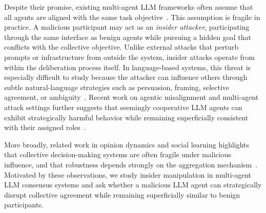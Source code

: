 \documentclass{article}
\theoremstyle{plain}
\theoremstyle{definition}
\theoremstyle{remark}
\begin{document}
Despite their promise, existing multi-agent LLM frameworks often assume that all agents are aligned with the same task objective~\citep{li2023camel,wu2023autogen}. This assumption is fragile in practice. A malicious participant may act as an \emph{insider attacker}, participating through the same interface as benign agents while pursuing a hidden goal that conflicts with the collective objective. Unlike external attacks that perturb prompts or infrastructure from outside the system, insider attacks operate from within the deliberation process itself. In language-based systems, this threat is especially difficult to study because the attacker can influence others through subtle natural-language strategies such as persuasion, framing, selective agreement, or ambiguity~\citep{ashery2025emergent,ren2024socialnorms}. Recent work on agentic misalignment and multi-agent attack settings further suggests that seemingly cooperative LLM agents can exhibit strategically harmful behavior while remaining superficially consistent with their assigned roles~\citep{anthropic2025agentic,hu2025masattack}.

More broadly, related work in opinion dynamics and social learning highlights that collective decision-making systems are often fragile under malicious influence, and that robustness depends strongly on the aggregation mechanism~\citep{GaitondeKleinbergTardos2020,AmirArieliAshkenaziGolanPeretz2025}. Motivated by these observations, we study insider manipulation in multi-agent LLM consensus systems and ask whether a malicious LLM agent can strategically disrupt collective agreement while remaining superficially similar to benign participants.
\end{document}
